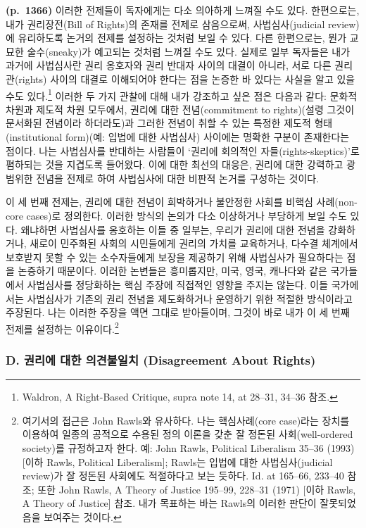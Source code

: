 \documentclass[a4paper,12pt,oneside]{article}  %
\begin{document}
\textbf{(p.~1366)} 이러한 전제들이 독자에게는 다소 의아하게 느껴질 수도
있다. 한편으로는, 내가 권리장전(Bill of Rights)의 존재를 전제로
삼음으로써, 사법심사(judicial review)에 유리하도록 논거의 전제를
설정하는 것처럼 보일 수 있다. 다른 한편으로는, 뭔가 교묘한
술수(sneaky)가 예고되는 것처럼 느껴질 수도 있다. 실제로 일부 독자들은
내가 과거에 사법심사란 권리 옹호자와 권리 반대자 사이의 대결이 아니라,
서로 다른 권리관(rights) 사이의 대결로 이해되어야 한다는 점을 논증한 바
있다는 사실을 알고 있을 수도 있다.\footnote{Waldron, A Right-Based
  Critique, supra note 14, at 28--31, 34--36 참조.} 이러한 두 가지
관찰에 대해 내가 강조하고 싶은 점은 다음과 같다: 문화적 차원과 제도적
차원 모두에서, 권리에 대한 전념(commitment to rights)(설령 그것이
문서화된 전념이라 하더라도)과 그러한 전념이 취할 수 있는 특정한 제도적
형태(institutional form)(예: 입법에 대한 사법심사) 사이에는 명확한
구분이 존재한다는 점이다. 나는 사법심사를 반대하는 사람들이 `권리에
회의적인 자들(rights-skeptics)'로 폄하되는 것을 지겹도록 들어왔다. 이에
대한 최선의 대응은, 권리에 대한 강력하고 광범위한 전념을 전제로 하여
사법심사에 대한 비판적 논거를 구성하는 것이다.

이 세 번째 전제는, 권리에 대한 전념이 희박하거나 불안정한 사회를 비핵심
사례(non-core cases)로 정의한다. 이러한 방식의 논의가 다소 이상하거나
부당하게 보일 수도 있다. 왜냐하면 사법심사를 옹호하는 이들 중 일부는,
우리가 권리에 대한 전념을 강화하거나, 새로이 민주화된 사회의 시민들에게
권리의 가치를 교육하거나, 다수결 체계에서 보호받지 못할 수 있는
소수자들에게 보장을 제공하기 위해 사법심사가 필요하다는 점을 논증하기
때문이다. 이러한 논변들은 흥미롭지만, 미국, 영국, 캐나다와 같은
국가들에서 사법심사를 정당화하는 핵심 주장에 직접적인 영향을 주지는
않는다. 이들 국가에서는 사법심사가 기존의 권리 전념을 제도화하거나
운영하기 위한 적절한 방식이라고 주장된다. 나는 이러한 주장을 액면 그대로
받아들이며, 그것이 바로 내가 이 세 번째 전제를 설정하는
이유이다.\footnote{여기서의 접근은 John Rawls와 유사하다. 나는
  핵심사례(core case)라는 장치를 이용하여 일종의 공적으로 수용된 정의
  이론을 갖춘 잘 정돈된 사회(well-ordered society)를 규정하고자 한다.
  예: John Rawls, Political Liberalism 35--36 (1993) {[}이하 Rawls,
  Political Liberalism{]}; Rawls는 입법에 대한 사법심사(judicial
  review)가 잘 정돈된 사회에도 적절하다고 보는 듯하다. Id. at 165--66,
  233--40 참조; 또한 John Rawls, A Theory of Justice 195--99, 228--31
  (1971) {[}이하 Rawls, A Theory of Justice{]} 참조. 내가 목표하는 바는
  Rawls의 이러한 판단이 잘못되었음을 보여주는 것이다.}

\subsubsection{D. 권리에 대한 의견불일치 (Disagreement About
Rights)}\label{d.-uxad8cuxb9acuxc5d0-uxb300uxd55c-uxc758uxacacuxbd88uxc77cuxce58-disagreement-about-rights}
\end{document}

